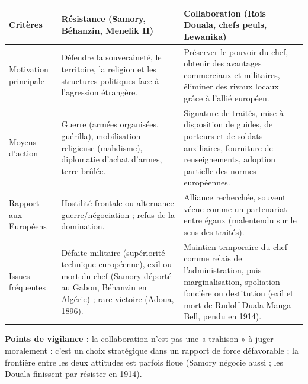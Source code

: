 \documentclass[11pt]{article}
\begin{document}
\begin{corrige}
\begin{center}
\begin{tabularx}{\linewidth}{|l|X|X|}
\hline
\rowcolor{popblueL}
\textbf{Critères} & \textbf{Résistance (Samory, Béhanzin, Menelik II)} & \textbf{Collaboration (Rois Douala, chefs peuls, Lewanika)} \\
\hline
Motivation principale & Défendre la souveraineté, le territoire, la religion et les structures politiques face à l'agression étrangère. & Préserver le pouvoir du chef, obtenir des avantages commerciaux et militaires, éliminer des rivaux locaux grâce à l'allié européen. \\
\hline
Moyens d'action & Guerre (armées organisées, guérilla), mobilisation religieuse (mahdisme), diplomatie d'achat d'armes, terre brûlée. & Signature de traités, mise à disposition de guides, de porteurs et de soldats auxiliaires, fourniture de renseignements, adoption partielle des normes européennes. \\
\hline
Rapport aux Européens & Hostilité frontale ou alternance guerre/négociation ; refus de la domination. & Alliance recherchée, souvent vécue comme un partenariat entre égaux (malentendu sur le sens des traités). \\
\hline
Issues fréquentes & Défaite militaire (supériorité technique européenne), exil ou mort du chef (Samory déporté au Gabon, Béhanzin en Algérie) ; rare victoire (Adoua, 1896). & Maintien temporaire du chef comme relais de l'administration, puis marginalisation, spoliation foncière ou destitution (exil et mort de Rudolf Duala Manga Bell, pendu en 1914). \\
\hline
\end{tabularx}
\end{center}
\textbf{Points de vigilance :} la collaboration n'est pas une « trahison » à juger moralement : c'est un choix stratégique dans un rapport de force défavorable ; la frontière entre les deux attitudes est parfois floue (Samory négocie aussi ; les Douala finissent par résister en 1914).
\end{corrige}
\end{document}
